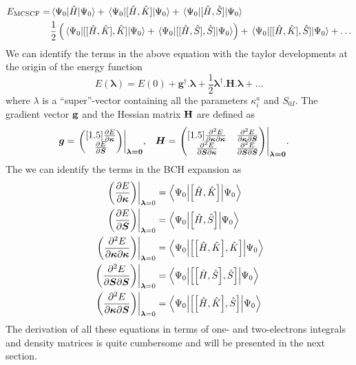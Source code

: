\documentclass[11pt,a4paper]{article}
\newcommand{\hH}{\Hat{H}} %
\newcommand{\hK}{\Hat{K}} %
\newcommand{\hS}{\Hat{S}}
\newcommand{\com}[2]{\mleft[#1,#2 \mright]}
\begin{document}
\begin{equation}
  \label{eq:MCSCF_NRJ_BCH}
  \begin{split}
    E_{\text{MCSCF}} = &\mel{\Psi_0}{\hH}{\Psi_0} + \mel{\Psi_0}{[\hH,\hK]}{\Psi_0} + \mel{\Psi_0}{[\hH,\hS]}{\Psi_0}  \\
      &\frac{1}{2} \left(\mel{\Psi_0}{[[\hH,\hK],\hK]}{\Psi_0}+ \mel{\Psi_0}{[[\hH,\hS],\hS]}{\Psi_0}\right) + \mel{\Psi_0}{[[\hH,\hK],\hS]}{\Psi_0} + \dots
  \end{split}
\end{equation}
We can identify the terms in the above equation with the taylor developments at the origin of the energy function
\begin{equation}
  \label{eq:MCSCF_NRJ_Taylor}
  E(\bm{\lambda}) = E(0) + \boldsymbol{g}^\dagger.\bm{\lambda} + \frac{1}{2} \bm{\lambda}^\dagger.\boldsymbol{H}.\bm{\lambda} + \dots
\end{equation}
where $\lambda$ is a ``super''-vector containing all the parameters $\kappa_i^a$ and $S_{0I}$. The gradient vector $\vb{g}$ and the Hessian matrix $\vb{H}$ are defined as
\begin{align}
  \bm{g} &= \evalat*{\begin{pmatrix}[1.5]\pdv{E}{\bm{\kappa}} \\ \pdv{E}{\bm{S}} \end{pmatrix}}{\bm{\lambda=0}},
         &
           \bm{H} &= \evalat*{\begin{pmatrix}[1.5]\pdv{E}{\bm{\kappa}}{\bm{\kappa}} & \pdv{E}{\bm{\kappa}}{\bm{S}} \\ \pdv{E}{\bm{S}}{\bm{\kappa}} & \pdv{E}{\bm{S}}{\bm{S}} \end{pmatrix}}{\bm{\lambda=0}}.
\end{align}
The we can identify the terms in the BCH expansion as
\begin{align}
  \evalat*{\mleft(\pdv{E}{\bm{\kappa}}\mright)}{\bm{\lambda}=0} &= \mel**{\Psi_0}{\com{\hH}{\hK}}{\Psi_0} \\
  \evalat*{\mleft(\pdv{E}{\bm{S}}\mright)}{\bm{\lambda}=0} &= \mel**{\Psi_0}{\com{\hH}{\hS}}{\Psi_0} \\
  \evalat*{\mleft(\pdv{E}{\bm{\kappa}}{\bm{\kappa}}\mright)}{\bm{\lambda}=0} &= \mel**{\Psi_0}{\com{\com{\hH}{\hK}}{\hK}}{\Psi_0} \\
  \evalat*{\mleft(\pdv{E}{\bm{S}}{\bm{S}}\mright)}{\bm{\lambda}=0} &= \mel**{\Psi_0}{\com{\com{\hH}{\hS}}{\hS}}{\Psi_0} \\
  \evalat*{\mleft(\pdv{E}{\bm{\kappa}}{\bm{S}}\mright)}{\bm{\lambda}=0} &= \mel**{\Psi_0}{\com{\com{\hH}{\hK}}{\hS}}{\Psi_0}
\end{align}
The derivation of all these equations in terms of one- and two-electrons integrals and density matrices is quite cumbersome and will be presented in the next section.
\end{document}
